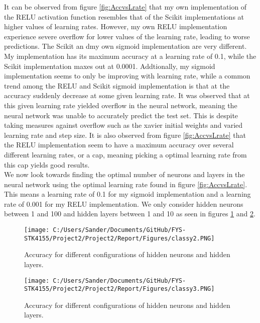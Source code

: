\documentclass[12pt,a4paper]{article}
\begin{document}
\noindent It can be observed from figure \ref{fig:AccvsLrate} that my own implementation of the RELU activation function resembles that of the Scikit implementations at higher values of learning rates. However, my own RELU implementation experience severe overflow for lower values of the learning rate, leading to worse predictions. The Scikit an dmy own sigmoid implementation are very different. My implementation has its maximum accuracy at a learning rate of 0.1, while the Scikit implementation maxes out at 0.0001. Addtionally, my sigmoid implementation seems to only be improving with learning rate, while a common trend among the RELU and Scikit sigmoid implementation is that at the accuracy suddenly decrease at some given learning rate. It was observed that at this given learning rate yielded overflow in the neural network, meaning the neural network was unable to accurately predict the test set. This is despite taking measures against overflow such as the xavier initial weights and varied learning rate and step size. It is also observed from figure \ref{fig:AccvsLrate} that the RELU implementation seem to have a maximum accuracy over several different learning rates, or a cap, meaning picking a optimal learning rate from this cap yields good results.
\\
We now look towards finding the optimal number of neurons and layers in the neural network using the optimal learning rate found in figure \ref{fig:AccvsLrate}. This means a learning rate of 0.1 for my sigmoid implementation and a learning rate of 0.001 for my RELU implementation. We only consider hidden neurons between 1 and 100 and hidden layers between 1 and 10 as seen in figures \ref{fig:AccvsLrate2} and \ref{fig:AccvsLrate3}.

\begin{figure}[H]
\centering
\texttt{[image: C:/Users/Sander/Documents/GitHub/FYS-STK4155/Project2/Project2/Report/Figures/classy2.PNG]}
\caption{\label{fig:AccvsLrate2} Accuracy for different configurations of hidden neurons and hidden layers.}
\end{figure}

\begin{figure}[H]
\centering
\texttt{[image: C:/Users/Sander/Documents/GitHub/FYS-STK4155/Project2/Project2/Report/Figures/classy3.PNG]}
\caption{\label{fig:AccvsLrate3} Accuracy for different configurations of hidden neurons and hidden layers.}
\end{figure}
\end{document}
